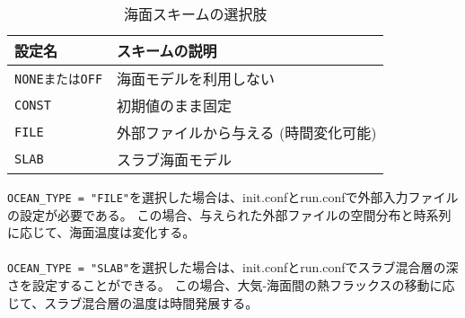 \begin{table}[h]
\begin{center}
  \caption{海面スキームの選択肢}
  \label{tab:nml_ocean}
  \begin{tabularx}{150mm}{lX} \hline
    \rowcolor[gray]{0.9}  設定名 & スキームの説明 \\ \hline
      \verb|NONEまたはOFF| & 海面モデルを利用しない              \\
      \verb|CONST|        & 初期値のまま固定                   \\
      \verb|FILE|         & 外部ファイルから与える (時間変化可能) \\
      \verb|SLAB|         & スラブ海面モデル                   \\
    \hline
  \end{tabularx}
\end{center}
\end{table}

\verb|OCEAN_TYPE = "FILE"|を選択した場合は、init.confとrun.confで外部入力ファイルの設定が必要である。
この場合、与えられた外部ファイルの空間分布と時系列に応じて、海面温度は変化する。\\

\\

\verb|OCEAN_TYPE = "SLAB"|を選択した場合は、init.confとrun.confでスラブ混合層の深さを設定することができる。
この場合、大気-海面間の熱フラックスの移動に応じて、スラブ混合層の温度は時間発展する。\\

